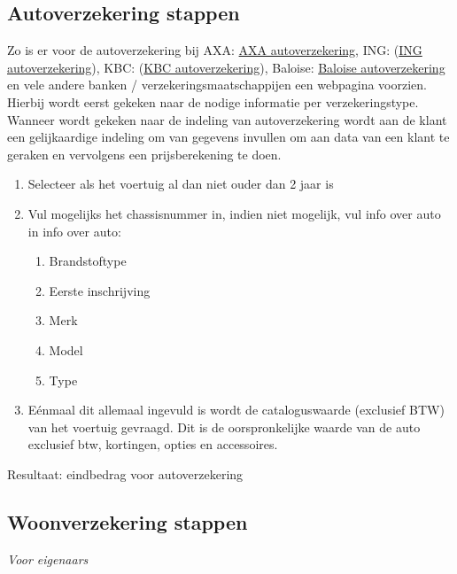 \subsection{Autoverzekering stappen}
\label{sec:autoverzekering-stappen}

Zo is er voor de autoverzekering bij AXA: \href{https://www.fo.axa.be/eauto/risk?dsfns=customers.be.axa.retail.mobility.contract.new.auto&LANG=nl}{AXA autoverzekering}, ING: (\href{https://www.ing.be/nl/retail/insurance/vehicles/car-insurance}{ING autoverzekering}), KBC: (\href{https://www.kbcbrussels.be/retail/en/processes/vehicle/autoverzekering-simuleren.html}{KBC autoverzekering}), Baloise: \href{https://www.berekenjeautopremie.be/nl/Baloise/l/met-welke-wagen-rijdt-u}{Baloise autoverzekering} en vele andere banken / verzekeringsmaatschappijen een webpagina voorzien.
Hierbij wordt eerst gekeken naar de nodige informatie per verzekeringstype.
Wanneer wordt gekeken naar de indeling van autoverzekering wordt aan de klant een gelijkaardige indeling om van gegevens invullen om aan data van een klant te geraken en vervolgens een prijsberekening te doen.
 
\begin{enumerate}[label=Stap \arabic*:]\label{enum:autoverzekering-stappen}
	\item Selecteer als het voertuig al dan niet ouder dan 2 jaar is
	\item Vul mogelijks het chassisnummer in, indien niet mogelijk, vul info over auto in
	info over auto: 
	\begin{enumerate}
		\item Brandstoftype
		\item Eerste inschrijving
		\item Merk
		\item Model
		\item Type
	\end{enumerate}
	\item Eénmaal dit allemaal ingevuld is wordt de cataloguswaarde (exclusief BTW) van het voertuig gevraagd.
	Dit is de oorspronkelijke waarde van de auto exclusief btw, kortingen, opties en accessoires.
\end{enumerate}
Resultaat: eindbedrag voor autoverzekering

\subsection{Woonverzekering stappen}
\emph{Voor eigenaars}

